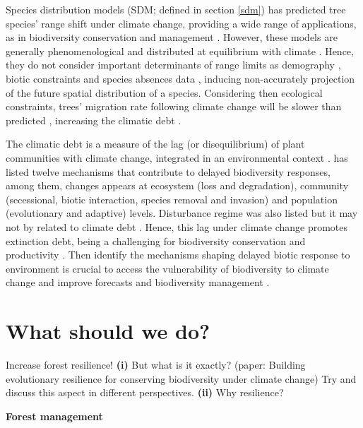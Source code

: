 Species distribution models (SDM; defined in section \ref{sdm}) has predicted tree species' range shift under climate change, providing a wide range of applications, as in biodiversity conservation and management \citep{Guisan2005,Guisan2013}.
However, these models are generally phenomenological and  distributed at equilibrium with climate \citep[e.g.][]{Pigot2013}.
Hence, they do not consider important determinants of range limits as demography \citep{Louthan2015}, biotic constraints \citep{Wisz2013,Pigot2013} and species absences data \citep{Koshkina2017}, inducing non-accurately projection of the future spatial distribution of a species.
Considering then ecological constraints, trees' migration rate following climate change will be slower than predicted \citep{Bertrand2011,Sittaro2017}, increasing the climatic debt \citep{Bertrand2016}.

The climatic debt is a measure of the lag (or disequilibrium) of plant communities with climate change, integrated in an environmental context \citep{Bertrand2016}.
\citet{Essl2015} has listed twelve mechanisms that contribute to delayed biodiversity responses, among them, changes appears at ecosystem (loss and degradation), community (secessional, biotic interaction, species removal and invasion) and population (evolutionary and adaptive) levels.
Disturbance regime was also listed but it may not by related to climate debt \citep{Bertrand2016}.
Hence, this lag under climate change promotes extinction debt, being a challenging for biodiversity conservation \citep{Kuussaari2009} and productivity \citep{Lasch2002}.
Then identify the mechanisms shaping delayed biotic response to environment is crucial to access the vulnerability of biodiversity to climate change and improve forecasts and biodiversity management \citep{Essl2015,Bertrand2016}.

\section{What should we do?}

Increase forest resilience! \textbf{(i)} But what is it exactly? (paper: Building evolutionary resilience for conserving biodiversity under climate change) Try and discuss this aspect in different perspectives. \textbf{(ii)} Why resilience?

\textbf{Forest management}

